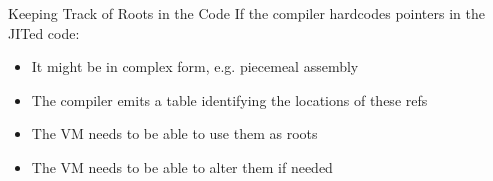 \documentclass[
14pt,
aspectratio=169,
usenames,
dvipsnames,
x11names]{beamer}
\begin{document}
\begin{frame}{Keeping Track of Roots in the Code}
  If the compiler hardcodes pointers in the JITed code:
  \vfill
  \begin{itemize}  \setlength{\itemsep}{\fill}
  \item It might be in complex form, e.g. \alert{piecemeal assembly}
  \item The compiler emits a table identifying the locations of these refs
  \item The VM needs to be able to use them as roots
  \item The VM needs to be able to alter them if needed
  \end{itemize}
\end{frame}


\end{document}
